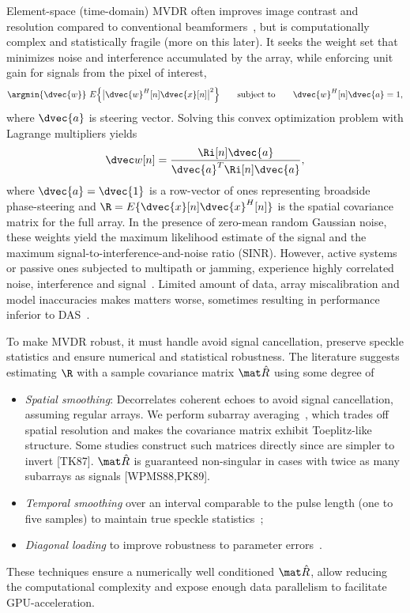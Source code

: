 {Element-space (time-domain) MVDR often improves image contrast and resolution compared to conventional beamformers~\cite{Benitz1997,Synnevag2007,Blomberg2013,Blomberg2012a,Dursun2009,Lo2004}, but is computationally complex and statistically fragile (more on this later). It seeks the weight set that minimizes noise and interference accumulated by the array, while enforcing unit gain for signals from the pixel of interest,
%
\begin{gather}
\argmin{\dvec{w}}\ E\Big\{\big|\dvec{w}^H[n]\dvec{x}[n]\big|^2\Big\} \qquad\text{subject to}\qquad \dvec{w}^H[n]\dvec{a} = 1, \label{2_eq_mvdr_def}
\end{gather}
%
where $\dvec{a}$ is steering vector. Solving this convex optimization problem with Lagrange multipliers yields
%
\begin{gather}
\dvec w[n] = \frac{\Ri[n]\dvec{a}}{\dvec{a}^T\Ri[n]\dvec{a}}, \label{2_eq_weights}
\end{gather}
%
where $\dvec{a}=\dvec{1}$ is a row-vector of ones representing broadside phase-steering and $\R=E\{\dvec{x}[n]\dvec{x}^H[n]\}$ is the spatial covariance matrix for the full array. In the presence of zero-mean random Gaussian noise, these weights yield the maximum likelihood estimate of the signal and the maximum signal-to-interference-and-noise ratio (SINR). However, active systems or passive ones subjected to multipath or jamming, experience highly correlated noise, interference and signal~\cite{Widrow1982}. Limited amount of data, array miscalibration and model inaccuracies makes matters worse, sometimes resulting in performance inferior to DAS~\cite{Li2006robust}. 

To make MVDR robust, it must handle avoid signal cancellation, preserve speckle statistics and ensure numerical and statistical robustness. The literature suggests estimating $\R$ with a sample covariance matrix $\eR$ using some degree of
%
\begin{itemize}
\item \emph{Spatial smoothing}: Decorrelates coherent echoes to avoid signal cancellation, assuming regular arrays. We perform subarray averaging~\cite{Kailath1985}, which trades off spatial resolution and makes the covariance matrix exhibit Toeplitz-like structure. Some studies construct such matrices directly since are simpler to invert [TK87]. $\eR$ is guaranteed non-singular in cases with twice as many subarrays as signals [WPMS88,PK89]. 
\item \emph{Temporal smoothing} over an interval comparable to the pulse length (one to five samples) to maintain true speckle statistics~\cite{Synnevag2009};
\item \emph{Diagonal loading} to improve robustness to parameter errors~\cite{Cox1987,Maksym1979,VanTrees2002}.
\end{itemize}%
%
These techniques ensure a numerically well conditioned $\eR$, allow reducing the computational complexity and expose enough data parallelism to facilitate GPU-acceleration. 


}
